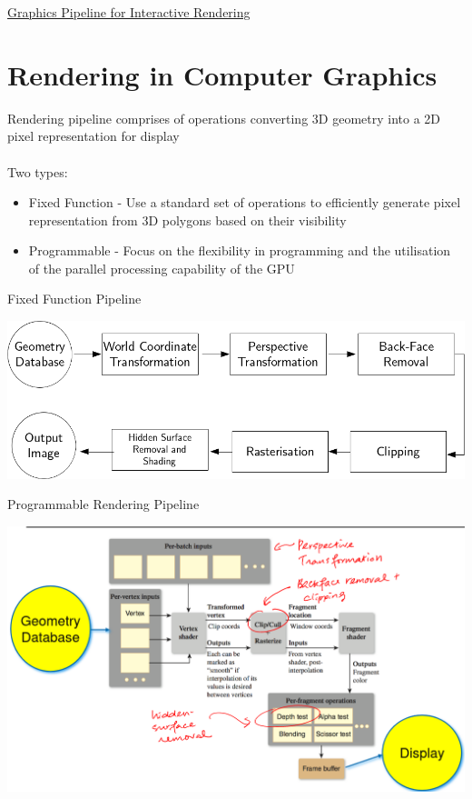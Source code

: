 \documentclass{article}[18pt]
\begin{document}
\begin{center}
\underline{\huge Graphics Pipeline for Interactive Rendering}
\end{center}
\section{Rendering in Computer Graphics}
Rendering pipeline comprises of operations converting 3D geometry into a 2D pixel representation for display\\
\\
Two types:
\begin{itemize}
	\item Fixed Function - Use a standard set of operations to efficiently generate pixel representation from 3D polygons based on their visibility
	\item Programmable - Focus on the flexibility in programming and the utilisation of the parallel processing capability of the GPU
\end{itemize}
Fixed Function Pipeline
\begin{center}
\includegraphics[scale=0.6]{Fixed-Function}
\end{center}
Programmable Rendering Pipeline
\begin{center}
	\includegraphics[scale=0.4]{programmable}
\end{center}
\end{document}
